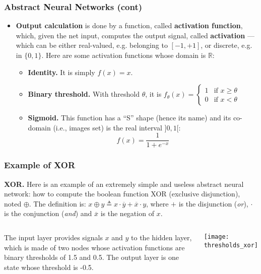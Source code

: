 %
\begin{frame}
\frametitle{Abstract Neural Networks (cont)}

\begin{itemize}

  \item \textbf{Output calculation} is done by a function, called
  \textbf{activation function}, which, given the net input, computes
  the output signal, called \textbf{activation} --- which can be
  either real-valued, e.g. belonging to \([-1,+1]\), or discrete,
  e.g. in \(\{0,1\}\). Here are some activation functions whose domain is
  \(\mathbb{R}\):
  \begin{itemize}

    \item \textbf{Identity.} It is simply $f(x) = x$.

    \item \textbf{Binary threshold.} With threshold $\theta$, it is
    \(
      f_{\theta}(x) = \begin{cases}
                        1 & \text{if } x \geqslant \theta\\
                        0 & \text{if } x < \theta
                      \end{cases}
    \)

    \item \textbf{Sigmoid.} This function has a ``S'' shape (hence
    its name) and its co-domain (i.e., images set) is the real interval
    $]0,1[$: \[f(x) = \frac{1}{1 + e^{-x}}\]

  \end{itemize}

\end{itemize}

\end{frame}

%
\begin{frame}
\frametitle{Example of XOR}

\textbf{XOR.} Here is an example of an extremely simple and useless
abstract neural network: how to compute the boolean function XOR
(exclusive disjunction), noted \(\oplus\). The definition is: \(x
\oplus y \triangleq x \cdot \overline{y} + \overline{x} \cdot y\),
where \(+\) is the disjunction (\emph{or}), \(\cdot\) is the
conjunction (\emph{and}) and \(\overline{x}\) is the negation of
\(x\).

\bigskip

\begin{columns}[c]
   The input layer provides signals \(x\) and
  \(y\) to the hidden layer, which is made of two nodes whose
  activation functions are binary thresholds of 1.5 and 0.5. The
  output layer is one state whose threshold is -0.5.

    \begin{center}
      \texttt{[image: thresholds\_xor]}
    \end{center}
\end{columns}

\end{frame}

